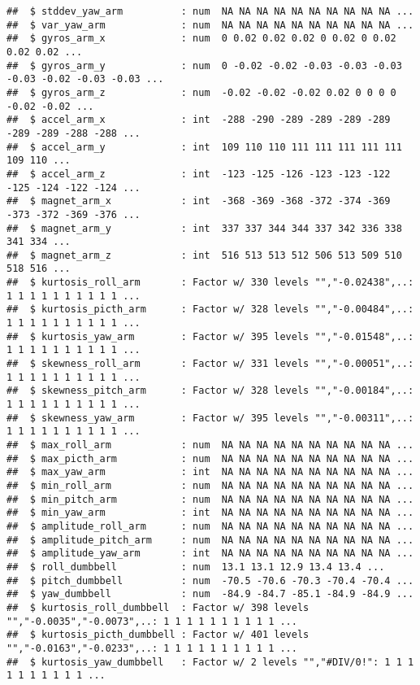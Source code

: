 \documentclass[]{article}
\begin{document}
\begin{verbatim}
##  $ stddev_yaw_arm          : num  NA NA NA NA NA NA NA NA NA NA ...
##  $ var_yaw_arm             : num  NA NA NA NA NA NA NA NA NA NA ...
##  $ gyros_arm_x             : num  0 0.02 0.02 0.02 0 0.02 0 0.02 0.02 0.02 ...
##  $ gyros_arm_y             : num  0 -0.02 -0.02 -0.03 -0.03 -0.03 -0.03 -0.02 -0.03 -0.03 ...
##  $ gyros_arm_z             : num  -0.02 -0.02 -0.02 0.02 0 0 0 0 -0.02 -0.02 ...
##  $ accel_arm_x             : int  -288 -290 -289 -289 -289 -289 -289 -289 -288 -288 ...
##  $ accel_arm_y             : int  109 110 110 111 111 111 111 111 109 110 ...
##  $ accel_arm_z             : int  -123 -125 -126 -123 -123 -122 -125 -124 -122 -124 ...
##  $ magnet_arm_x            : int  -368 -369 -368 -372 -374 -369 -373 -372 -369 -376 ...
##  $ magnet_arm_y            : int  337 337 344 344 337 342 336 338 341 334 ...
##  $ magnet_arm_z            : int  516 513 513 512 506 513 509 510 518 516 ...
##  $ kurtosis_roll_arm       : Factor w/ 330 levels "","-0.02438",..: 1 1 1 1 1 1 1 1 1 1 ...
##  $ kurtosis_picth_arm      : Factor w/ 328 levels "","-0.00484",..: 1 1 1 1 1 1 1 1 1 1 ...
##  $ kurtosis_yaw_arm        : Factor w/ 395 levels "","-0.01548",..: 1 1 1 1 1 1 1 1 1 1 ...
##  $ skewness_roll_arm       : Factor w/ 331 levels "","-0.00051",..: 1 1 1 1 1 1 1 1 1 1 ...
##  $ skewness_pitch_arm      : Factor w/ 328 levels "","-0.00184",..: 1 1 1 1 1 1 1 1 1 1 ...
##  $ skewness_yaw_arm        : Factor w/ 395 levels "","-0.00311",..: 1 1 1 1 1 1 1 1 1 1 ...
##  $ max_roll_arm            : num  NA NA NA NA NA NA NA NA NA NA ...
##  $ max_picth_arm           : num  NA NA NA NA NA NA NA NA NA NA ...
##  $ max_yaw_arm             : int  NA NA NA NA NA NA NA NA NA NA ...
##  $ min_roll_arm            : num  NA NA NA NA NA NA NA NA NA NA ...
##  $ min_pitch_arm           : num  NA NA NA NA NA NA NA NA NA NA ...
##  $ min_yaw_arm             : int  NA NA NA NA NA NA NA NA NA NA ...
##  $ amplitude_roll_arm      : num  NA NA NA NA NA NA NA NA NA NA ...
##  $ amplitude_pitch_arm     : num  NA NA NA NA NA NA NA NA NA NA ...
##  $ amplitude_yaw_arm       : int  NA NA NA NA NA NA NA NA NA NA ...
##  $ roll_dumbbell           : num  13.1 13.1 12.9 13.4 13.4 ...
##  $ pitch_dumbbell          : num  -70.5 -70.6 -70.3 -70.4 -70.4 ...
##  $ yaw_dumbbell            : num  -84.9 -84.7 -85.1 -84.9 -84.9 ...
##  $ kurtosis_roll_dumbbell  : Factor w/ 398 levels "","-0.0035","-0.0073",..: 1 1 1 1 1 1 1 1 1 1 ...
##  $ kurtosis_picth_dumbbell : Factor w/ 401 levels "","-0.0163","-0.0233",..: 1 1 1 1 1 1 1 1 1 1 ...
##  $ kurtosis_yaw_dumbbell   : Factor w/ 2 levels "","#DIV/0!": 1 1 1 1 1 1 1 1 1 1 ...

\end{verbatim}
\end{document}

